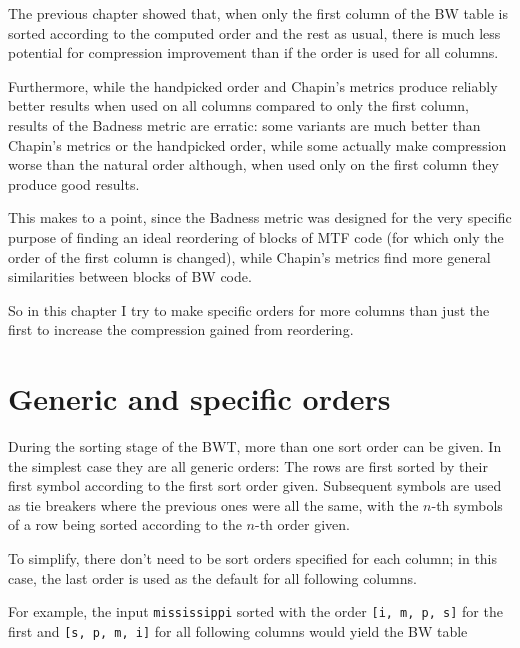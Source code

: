 \documentclass[a4paper]{scrreprt}
\begin{document}
The previous chapter showed that, when only the first column of the BW table is
sorted according to the computed order and the rest as usual, there is much less
potential for compression improvement than if the order is used for all columns.

Furthermore, while the handpicked order and Chapin's metrics produce reliably
better results when used on all columns compared to only the first column,
results of the Badness metric are erratic: some variants are much better than
Chapin's metrics or the handpicked order, while some actually make compression
worse than the natural order although, when used only on the first column they
produce good results.

This makes to a point, since the Badness metric was designed for the very
specific purpose of finding an ideal reordering of blocks of MTF code (for
which only the order of the first column is changed), while Chapin's metrics
find more general similarities between blocks of BW code.

So in this chapter I try to make specific orders for more columns than just the
first to increase the compression gained from reordering.

\section{Generic and specific orders}

During the sorting stage of the BWT, more than one sort order can be given. In
the simplest case they are all generic orders: The rows are first sorted by
their first symbol according to the first sort order given. Subsequent symbols
are used as tie breakers where the previous ones were all the same, with the
\(n\)-th symbols of a row being sorted according to the \(n\)-th order given.

To simplify, there don't need to be sort orders specified for each column; in
this case, the last order is used as the default for all following columns.

For example, the input \texttt{mississippi} sorted with the order \texttt{[i, m,
p, s]} for the first and \texttt{[s, p, m, i]} for all following columns would
yield the BW table
\end{document}

